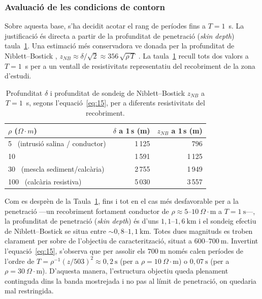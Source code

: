 \documentclass[11pt,a4paper,oneside]{article}
\begin{document}
\vspace{5pt}
\subsubsection{Avaluació de les condicions de contorn}
 
Sobre aquesta base, s'ha decidit acotar el rang de períodes fins a $T = 1$~s. La
justificació és directa a partir de la profunditat de penetració (\emph{skin depth}) taula~\ref{tab:skindepth}. Una estimació més conservadora ve donada per la profunditat de
Niblett--Bostick \citep{niblett1960, bostick1977}, $z_{NB} \approx \delta/\sqrt{2} \approx 356\,\sqrt{\rho\,T}$ . La
taula~\ref{tab:skindepth} recull tots dos valors a $T = 1$~s per a un ventall de
resistivitats representatiu del recobriment de la zona d'estudi.

\vspace{5pt}

 
\begin{table}[H]
    \centering
    
    \begin{tabular}{l r r}
        \toprule
        $\rho$ ($\Omega\cdot m$) & $\delta$ a 1\,s (m) & $z_{NB}$ a 1\,s (m) \\
        \midrule
        5 \ (intrusió salina / conductor) & 1\,125 & 796 \\
        10                                & 1\,591 & 1\,125 \\
        30 \ (mescla sediment/calcària)   & 2\,755 & 1\,949 \\
        100 \ (calcària resistiva)        & 5\,030 & 3\,557 \\
        \bottomrule
    \end{tabular}
    \caption{Profunditat $\delta$ i profunditat de sondeig de
    Niblett--Bostick $z_{NB}$ a $T = 1$~s, segons l'equació~\eqref{eq:15},
    per a diferents resistivitats del recobriment.}
    \label{tab:skindepth}
\end{table}
 
Com es desprèn de la Taula~\ref{tab:skindepth}, fins i tot en el cas més desfavorable per a la penetració —un recobriment fortament conductor de $\rho \approx 5\text{--}10~\Omega\cdot\text{m}$ a $T = 1~\text{s}$—, la profunditat de penetració (\textit{skin depth}) és d'uns $1{,}1\text{--}1{,}6~\text{km}$ i el sondeig efectiu de Niblett--Bostick se situa entre $\sim 0{,}8\text{--}1{,}1~\text{km}$. Totes dues magnituds es troben clarament per sobre de l'objectiu de caracterització, situat a $600\text{--}700~\text{m}$. Invertint l'equació~\eqref{eq:15}, s'observa que per assolir els $700~\text{m}$ només calen períodes de l'ordre de $T = \rho^{-1} (z/503)^{2} \approx 0{,}2~\text{s}$ (per a $\rho = 10~\Omega\cdot\text{m}$) o $0{,}07~\text{s}$ (per a $\rho = 30~\Omega\cdot\text{m}$). D'aquesta manera, l'estructura objectiu queda plenament continguda dins la banda mostrejada i no pas al límit de penetració, on quedaria mal restringida.
\end{document}

